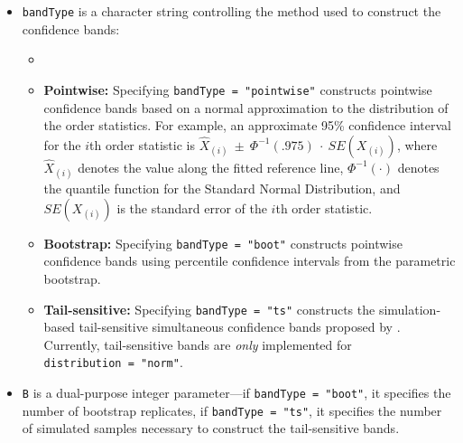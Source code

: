 \begin{itemize}
\item
  \texttt{bandType} is a character string controlling the method used to
  construct the confidence bands:

  \begin{itemize}
  \tightlist
  \item
  \item
    \textbf{Pointwise:} Specifying \texttt{bandType\ =\ "pointwise"}
    constructs pointwise confidence bands based on a normal
    approximation to the distribution of the order statistics. For
    example, an approximate 95\% confidence interval for the \(i\)th
    order statistic is
    \(\widehat{X}_{(i)}~\pm~\Phi^{-1}(.975)~\cdot~SE(X_{(i)})\), where
    \(\widehat{X}_{(i)}\) denotes the value along the fitted reference
    line, \(\Phi^{-1}(\cdot)\) denotes the quantile function for the
    Standard Normal Distribution, and \(SE(X_{(i)})\) is the standard
    error of the \(i\)th order statistic.
  \item
    \textbf{Bootstrap:} Specifying \texttt{bandType\ =\ "boot"}
    constructs pointwise confidence bands using percentile confidence
    intervals from the parametric bootstrap.
  \item
    \textbf{Tail-sensitive:} Specifying \texttt{bandType\ =\ "ts"}
    constructs the simulation-based tail-sensitive simultaneous
    confidence bands proposed by \citet{Aldor-Noiman2013-xw}. Currently,
    tail-sensitive bands are \emph{only} implemented for
    \texttt{distribution\ =\ "norm"}.
  \end{itemize}
\item
  \texttt{B} is a dual-purpose integer parameter---if
  \texttt{bandType\ =\ "boot"}, it specifies the number of bootstrap
  replicates, if \texttt{bandType\ =\ "ts"}, it specifies the number of
  simulated samples necessary to construct the tail-sensitive bands.

\end{itemize}
